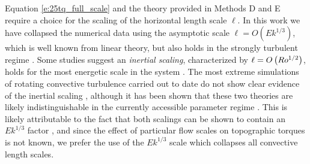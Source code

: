 \textcolor{\revttxt}{Equation \ref{e:25tq_full_scale} and the theory provided in Methods D and E require a choice for the scaling of the horizontal length scale $\ell$. In this work we have collapsed the numerical data using the asymptotic scale $\ell= O(Ek^{1/3})$, which is well known from linear theory, but also holds in the strongly turbulent regime \citep{mS06}. Some studies suggest an \textit{inertial scaling}, characterized by $\ell = O\left ( Ro^{1/2}\right )$, holds for the most energetic scale in the system \citep{cG19,cG25}. The most extreme simulations of rotating convective turbulence carried out to date do not show clear evidence of the inertial scaling \citep{tO23}, although it has been shown that these two theories are likely indistinguishable in the currently accessible parameter regime \citep{jA24}. This is likely attributable to the fact that both scalings can be shown to contain an $Ek^{1/3}$ factor \citep{jmA20, sM21,jN24}, and since the effect of particular flow scales on topographic torques is not known, we prefer the use of the $Ek^{1/3}$ scale which collapses all convective length scales.
}
		
